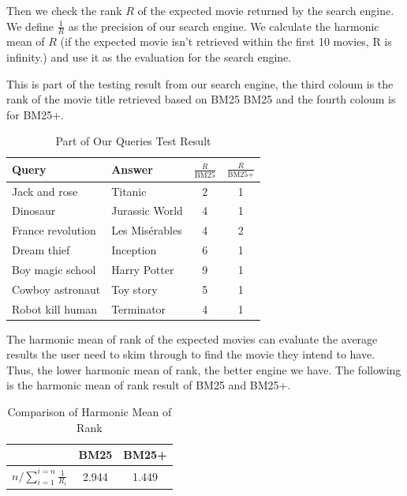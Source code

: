 \documentclass[sigconf,nonacm]{acmart}
\begin{document}
Then we check the rank $R$ of the expected movie returned by the search
engine.
We define $\frac{1}{R}$ as the precision of our search engine.
We calculate the harmonic mean of $R$ (if the expected movie isn’t retrieved
within the first 10 movies, R is infinity.) and use it as the evaluation for
the search engine.

This is part of the testing result from our search engine, the third coloum
is the rank of the movie title retrieved based on BM25 BM25 and the fourth
coloum is for BM25+.


\begin{table}[H]
  \caption{Part of Our Queries Test Result}
  \label{tab:query_result}
  \begin{tabular}{llcc}
    \toprule
    Query             & Answer         & $\frac{R}{\text{BM25}}$ & $\frac{R}{\text{BM25+}}$ \\
    \midrule
    Jack and rose     & Titanic        & 2                       & 1                        \\
    Dinosaur          & Jurassic World & 4                       & 1                        \\
    France revolution & Les Misérables & 4                       & 2                        \\
    Dream thief       & Inception      & 6                       & 1                        \\
    Boy magic school  & Harry Potter   & 9                       & 1                        \\
    Cowboy astronaut  & Toy story      & 5                       & 1                        \\
    Robot kill human  & Terminator     & 4                       & 1                        \\
    \bottomrule
  \end{tabular}
\end{table}

The harmonic mean of rank of the expected movies can evaluate the average
results the user need to skim through to find the movie they intend to have.
Thus, the lower harmonic mean of rank, the better engine we have.
The following is the harmonic mean of rank result of BM25 and BM25+.


\begin{table}[H]
  \caption{Comparison of Harmonic Mean of Rank }
  \begin{tabular}{ c  c c}
    \toprule
                                              & BM25  & BM25+ \\
    \midrule
    $ n / \sum_{i=1}^{i=n} \frac{1}{R_{i}}  $ & 2.944 & 1.449 \\
    \bottomrule
  \end{tabular}
\end{table}
\end{document}
